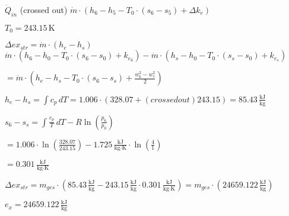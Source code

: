 \( \dot{Q}_{in} \) (crossed out)  
\( \dot{m} \cdot (h_6 - h_5 - T_0 \cdot (s_6 - s_5) + \Delta k_e) \)  

\( T_0 = 243.15 \, \text{K} \)  

\( \Delta ex_{str} = \dot{m} \cdot (h_e - h_s) \)  
\( \dot{m} \cdot (h_6 - h_0 - T_0 \cdot (s_6 - s_0) + k_e_6) - \dot{m} \cdot (h_s - h_0 - T_0 \cdot (s_s - s_0) + k_e_s) \)  

\( = \dot{m} \cdot (h_e - h_s - T_0 \cdot (s_6 - s_s) + \frac{w_6^2 - w_s^2}{2}) \)  

\( h_e - h_s = \int c_p \, dT = 1.006 \cdot (328.07 + (crossed out)243.15) = 85.43 \, \frac{\text{kJ}}{\text{kg}} \)  

\( s_6 - s_s = \int \frac{c_p}{T} \, dT - R \ln \left( \frac{p_6}{p_0} \right) \)  

\( = 1.006 \cdot \ln \left( \frac{328.07}{243.15} \right) - 1.725 \, \frac{\text{kJ}}{\text{kg·K}} \cdot \ln \left( \frac{4}{1} \right) \)  

\( = 0.301 \, \frac{\text{kJ}}{\text{kg·K}} \)  

\( \Delta ex_{str} = m_{ges} \cdot (85.43 \, \frac{\text{kJ}}{\text{kg}} - 243.15 \, \frac{\text{kJ}}{\text{kg}} \cdot 0.301 \, \frac{\text{kJ}}{\text{kg·K}}) = m_{ges} \cdot (24659.122 \, \frac{\text{kJ}}{\text{kg}}) \)  

\( e_x = 24659.122 \, \frac{\text{kJ}}{\text{kg}} \)